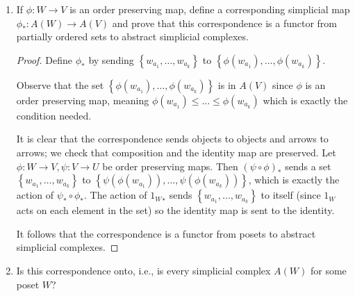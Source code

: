\documentclass[11pt]{article}
\newcommand{\cbr}[1]{\left\{#1\right\}}
\begin{document}
\begin{enumerate}
\begin{enumerate}
\begin{proof}
            Take any subset $\cbr{w_{a_{b_1}}, \dots, w_{a_{b_j}}}$ of $\cbr{w_{a_1},w_{a_2},\dots,w_{a_k}}$. Since the elements $w_{a_i}$ form a chain, the subset of elements $w_{a_{b_\ell}}$ form a chain also. It follows that we can relabel and order the elements as $w_{a_{b_1}}\leq\cdots \leq w_{a_{b_j}}$; it follows that $\cbr{w_{a_{b_1}}, \dots, w_{a_{b_j}}}$ is in $A(W)$. Trivially the singleton sets $\cbr{w_{a_i}}$ for each $i$ are ordered already so they are found in $A(W)$. Since $\cbr{w_{a_1},w_{a_2},\dots,w_{a_k}}$ was arbitary, it follows that $A(W)$ is an abstract simplicial complex.
        \end{proof}
        \item If $\phi\colon W\to V$ is an order preserving map, define a corresponding simplicial map $\phi_\ast\colon A(W)\to A(V)$ and prove that this correspondence is a functor from partially ordered sets to abstract simplicial complexes. \begin{proof}
            Define $\phi_\ast$ by sending $\cbr{w_{a_1},\dots,w_{a_k}}$ to $\cbr{\phi(w_{a_1}),\dots,\phi(w_{a_k})}$.
            
            Observe that the set $\cbr{\phi(w_{a_1}),\dots,\phi(w_{a_k})}$ is in $A(V)$ since $\phi$ is an order preserving map, meaning $\phi(w_{a_1})\leq \dots\leq\phi(w_{a_k})$ which is exactly the condition needed.

            It is clear that the correspondence sends objects to objects and arrows to arrows; we check that composition and the identity map are preserved. Let $\phi\colon W\to V,\psi\colon V\to U$ be order preserving maps. Then $(\psi\circ\phi)_\ast$ sends a set $\cbr{w_{a_1},\dots,w_{a_k}}$ to $\cbr{\psi(\phi(w_{a_1})),\dots,\psi(\phi(w_{a_k}))}$, which is exactly the action of $\psi_\ast\circ\phi_\ast$. The action of ${1_W}_\ast$ sends $\cbr{w_{a_1},\dots,w_{a_k}}$ to itself (since $1_W$ acts on each element in the set) so the identity map is sent to the identity. 

            It follows that the correspondence is a functor from posets to abstract simplicial complexes.
        \end{proof}
        \item Is this correspondence onto, i.e., is every simplicial complex $A(W)$ for some poset $W$? 
        

\end{enumerate}
\end{enumerate}
\end{document}
